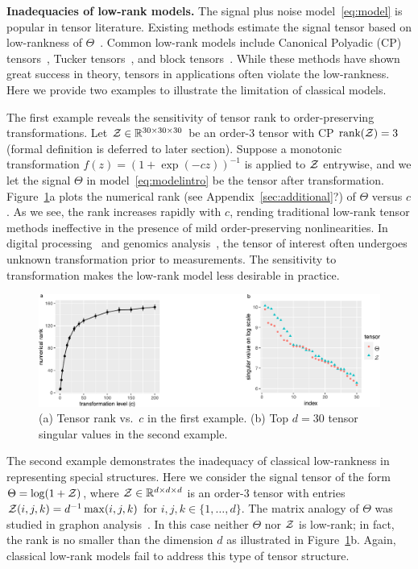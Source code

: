\documentclass{article}
\theoremstyle{plain}
\theoremstyle{definition}
\begin{document}
{\bf Inadequacies of  low-rank models.} The signal plus noise model~\eqref{eq:model} is popular in tensor literature. Existing methods estimate the signal tensor based on low-rankness of $\Theta$~\citep{jain2014provable,montanari2018spectral}. Common low-rank models include Canonical Polyadic (CP) tensors~\citep{hitchcock1927expression}, Tucker tensors~\citep{de2000multilinear}, and block tensors~\citep{wang2019multiway}. While these methods have shown great success in theory, tensors in applications often violate the low-rankness. Here we provide two examples to illustrate the limitation of classical models.


The first example reveals the sensitivity of tensor rank to order-preserving transformations. Let $\mathcal{Z} \in \mathbb{R}^{30\times 30\times 30}$ be an order-3 tensor with CP $\text{rank}(\mathcal{Z})=3$ (formal definition is deferred to later section). Suppose a monotonic transformation $f(z)=(1+\exp(-cz))^{-1}$ is applied to $\mathcal{Z}$ entrywise, and we let the signal $\Theta$ in model~\eqref{eq:modelintro} be the tensor after transformation. Figure~\ref{fig:example}a plots the numerical rank (see Appendix~\ref{sec:additional}{\color{red}?}) of $\Theta$ versus $c$. As we see, the rank increases rapidly with $c$, rending traditional low-rank tensor methods ineffective in the presence of mild order-preserving nonlinearities. In  digital processing~\citep{ghadermarzy2018learning} and genomics analysis~\citep{hore2016tensor}, the tensor of interest often undergoes unknown transformation prior to measurements. The sensitivity to transformation makes the low-rank model less desirable in practice. 

\begin{figure}[h]
\captionsetup{font=footnotesize}
\centering
\vspace{-.2cm}
\includegraphics[width=.65\textwidth]{figure/example_comb2.pdf}
\vspace{-.1cm}
\caption{(a) Tensor rank vs.\ $c$ in the first example. (b) Top $d=30$ tensor singular values in the second example. }
\vspace{-.2cm}
\label{fig:example}
\end{figure}

The second example demonstrates the inadequacy of classical low-rankness in representing special structures. Here we consider the signal tensor of the form $\Theta=\log(1+\mathcal{Z})$, where $\mathcal{Z}\in\mathbb{R}^{d\times d\times d}$ is an order-3 tensor with entries $\mathcal{Z}(i,j,k)=d^{-1}\max(i,j,k)$ for $i,j,k\in\{1,\ldots,d\}$. The matrix analogy of $\Theta$ was studied in graphon analysis~\cite{chan2014consistent}. In this case neither $\Theta$ nor $\mathcal{Z}$ is low-rank; in fact, the rank is no smaller than the dimension $d$ as illustrated in Figure~\ref{fig:example}b. Again, classical low-rank models fail to address this type of tensor structure. 
\end{document}
